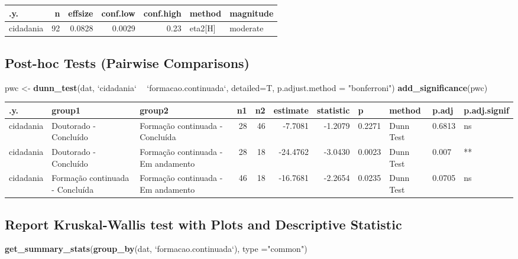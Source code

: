 \documentclass[]{article}
\newenvironment{Shaded}{\begin{snugshade}}{\end{snugshade}}
\newcommand{\DataTypeTok}[1]{\textcolor[rgb]{0.13,0.29,0.53}{#1}}
\newcommand{\KeywordTok}[1]{\textcolor[rgb]{0.13,0.29,0.53}{\textbf{#1}}}
\newcommand{\NormalTok}[1]{#1}
\newcommand{\OperatorTok}[1]{\textcolor[rgb]{0.81,0.36,0.00}{\textbf{#1}}}
\newcommand{\StringTok}[1]{\textcolor[rgb]{0.31,0.60,0.02}{#1}}
\begin{document}
\begin{longtable}[]{@{}lrrrrll@{}}
\toprule
.y. & n & effsize & conf.low & conf.high & method &
magnitude\tabularnewline
\midrule
\endhead
cidadania & 92 & 0.0828 & 0.0029 & 0.23 & eta2{[}H{]} &
moderate\tabularnewline
\bottomrule
\end{longtable}

\hypertarget{post-hoc-tests-pairwise-comparisons}{%
\subsection{Post-hoc Tests (Pairwise
Comparisons)}\label{post-hoc-tests-pairwise-comparisons}}

\begin{Shaded}
\begin{Highlighting}[]
\NormalTok{pwc <-}\StringTok{ }\KeywordTok{dunn_test}\NormalTok{(dat, }\StringTok{`}\DataTypeTok{cidadania}\StringTok{`} \OperatorTok{~}\StringTok{ `}\DataTypeTok{formacao.continuada}\StringTok{`}\NormalTok{, }\DataTypeTok{detailed=}\NormalTok{T, }\DataTypeTok{p.adjust.method =} \StringTok{"bonferroni"}\NormalTok{)}
\KeywordTok{add_significance}\NormalTok{(pwc)}
\end{Highlighting}
\end{Shaded}

\begin{longtable}[]{@{}lllrrrrllll@{}}
\toprule
.y. & group1 & group2 & n1 & n2 & estimate & statistic & p & method &
p.adj & p.adj.signif\tabularnewline
\midrule
\endhead
cidadania & Doutorado - Concluído & Formação continuada - Concluída & 28
& 46 & -7.7081 & -1.2079 & 0.2271 & Dunn Test & 0.6813 &
ns\tabularnewline
cidadania & Doutorado - Concluído & Formação continuada - Em andamento &
28 & 18 & -24.4762 & -3.0430 & 0.0023 & Dunn Test & 0.007 &
**\tabularnewline
cidadania & Formação continuada - Concluída & Formação continuada - Em
andamento & 46 & 18 & -16.7681 & -2.2654 & 0.0235 & Dunn Test & 0.0705 &
ns\tabularnewline
\bottomrule
\end{longtable}

\hypertarget{report-kruskal-wallis-test-with-plots-and-descriptive-statistic}{%
\subsection{Report Kruskal-Wallis test with Plots and Descriptive
Statistic}\label{report-kruskal-wallis-test-with-plots-and-descriptive-statistic}}

\begin{Shaded}
\begin{Highlighting}[]
\KeywordTok{get_summary_stats}\NormalTok{(}\KeywordTok{group_by}\NormalTok{(dat, }\StringTok{`}\DataTypeTok{formacao.continuada}\StringTok{`}\NormalTok{), }\DataTypeTok{type =}\StringTok{"common"}\NormalTok{)}
\end{Highlighting}
\end{Shaded}
\end{document}
